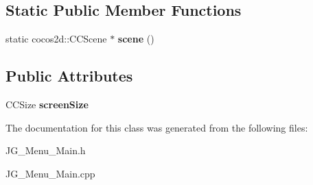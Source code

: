 \subsection*{Static Public Member Functions}
\begin{DoxyCompactItemize}
\item 
\hypertarget{class_j_g___menu___main_a4725c05fccdb74b94d0b097e6310f743}{static cocos2d\-::\-C\-C\-Scene $\ast$ {\bfseries scene} ()}\label{class_j_g___menu___main_a4725c05fccdb74b94d0b097e6310f743}

\end{DoxyCompactItemize}
\subsection*{Public Attributes}
\begin{DoxyCompactItemize}
\item 
\hypertarget{class_j_g___menu___main_af923158ecb3dc03e4e35fcd11fb27a53}{C\-C\-Size {\bfseries screen\-Size}}\label{class_j_g___menu___main_af923158ecb3dc03e4e35fcd11fb27a53}

\end{DoxyCompactItemize}


The documentation for this class was generated from the following files\-:\begin{DoxyCompactItemize}
\item 
J\-G\-\_\-\-Menu\-\_\-\-Main.\-h\item 
J\-G\-\_\-\-Menu\-\_\-\-Main.\-cpp\end{DoxyCompactItemize}
